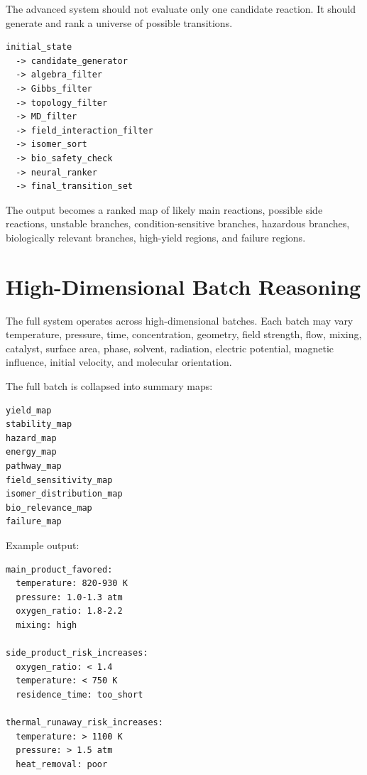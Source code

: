 \documentclass[11pt]{article}
\begin{document}
The advanced system should not evaluate only one candidate reaction. It should generate and rank a universe of possible transitions.

\begin{lstlisting}[caption={Candidate-generation pipeline}]
initial_state
  -> candidate_generator
  -> algebra_filter
  -> Gibbs_filter
  -> topology_filter
  -> MD_filter
  -> field_interaction_filter
  -> isomer_sort
  -> bio_safety_check
  -> neural_ranker
  -> final_transition_set
\end{lstlisting}

The output becomes a ranked map of likely main reactions, possible side reactions, unstable branches, condition-sensitive branches, hazardous branches, biologically relevant branches, high-yield regions, and failure regions.

\section{High-Dimensional Batch Reasoning}

The full system operates across high-dimensional batches. Each batch may vary temperature, pressure, time, concentration, geometry, field strength, flow, mixing, catalyst, surface area, phase, solvent, radiation, electric potential, magnetic influence, initial velocity, and molecular orientation.

The full batch is collapsed into summary maps:

\begin{lstlisting}[caption={Batch summary maps}]
yield_map
stability_map
hazard_map
energy_map
pathway_map
field_sensitivity_map
isomer_distribution_map
bio_relevance_map
failure_map
\end{lstlisting}

Example output:

\begin{lstlisting}[caption={Example process-region summary}]
main_product_favored:
  temperature: 820-930 K
  pressure: 1.0-1.3 atm
  oxygen_ratio: 1.8-2.2
  mixing: high

side_product_risk_increases:
  oxygen_ratio: < 1.4
  temperature: < 750 K
  residence_time: too_short

thermal_runaway_risk_increases:
  temperature: > 1100 K
  pressure: > 1.5 atm
  heat_removal: poor
\end{lstlisting}

\end{document}
